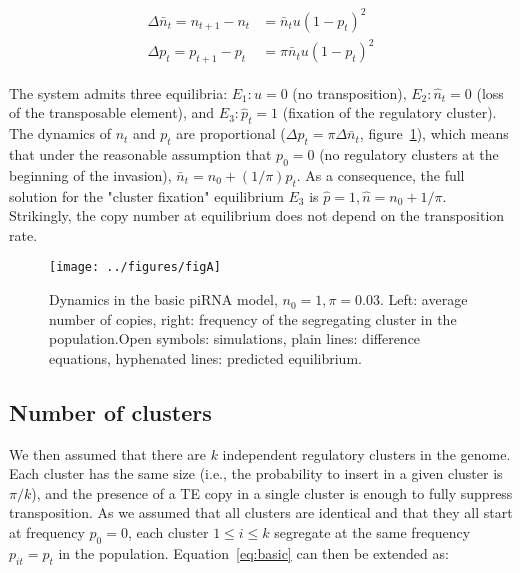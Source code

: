 \documentclass[10pt,a4paper]{article}
\begin{document}
\begin{align}\label{eq:basic}
\begin{split}
\Delta \bar n_t = n_{t+1} - n_t &= \bar n_t u (1-p_t)^2 \\
\Delta p_t = p_{t+1} - p_t &= \pi \bar n_t u (1-p_t)^2
\end{split}
\end{align}

The system admits three equilibria: $E_1: u = 0$ (no transposition), $E_2: \hat n_t = 0$ (loss of the transposable element), and $E_3: \hat p_t = 1$ (fixation of the regulatory cluster). The dynamics of $n_t$ and $p_t$ are proportional ($\Delta p_t = \pi \Delta \bar n_t$, figure~\ref{fig:figA}), which means that under the reasonable assumption that $p_0 = 0$ (no regulatory clusters at the beginning of the invasion), $\bar n_t = n_0 + (1/\pi) p_t$. As a consequence, the full solution for the "cluster fixation" equilibrium $E_3$ is $\hat p = 1, \hat n = n_0 + 1/\pi$. Strikingly, the copy number at equilibrium does not depend on the transposition rate. 

\begin{figure}[h]
\begin{adjustwidth}{-1in}{0in}
\begin{flushright}
	\texttt{[image: ../figures/figA]}
\caption{\label{fig:figA} Dynamics in the basic piRNA model, $n_0=1, \pi=0.03$. Left: average number of copies, right: frequency of the segregating cluster in the population.Open symbols: simulations, plain lines: difference equations, hyphenated lines: predicted equilibrium. }
\end{flushright}\end{adjustwidth}
\end{figure}



\subsection{Number of clusters}

We then assumed that there are $k$ independent regulatory clusters in the genome. Each cluster has the same size (i.e., the probability to insert in a given cluster is $\pi/k$), and the presence of a TE copy in a single cluster is enough to fully suppress transposition. As we assumed that all clusters are identical and that they all start at frequency $p_0 = 0$, each cluster $1 \leq i \leq k$ segregate at the same frequency $p_{it} = p_t$ in the population. Equation~\ref{eq:basic} can then be extended as:
\end{document}
